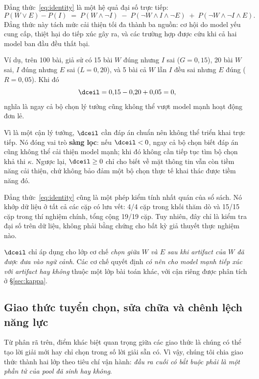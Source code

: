Đẳng thức~\eqref{eq:identity} là một hệ quả đại số trực tiếp:
\[
P(W \vee E) - P(I) \;=\; P(W \wedge \neg I) \;-\; P(\neg W \wedge I \wedge \neg E)
\;+\; P(\neg W \wedge \neg I \wedge E).
\]
Đẳng thức này tách mức cải thiện tối đa thành ba nguồn: cơ hội do model yếu cung cấp, thiệt hại
do tiếp xúc gây ra, và các trường hợp được cứu khi cả hai model ban đầu đều thất bại.

Ví dụ, trên 100 bài, giả sử có 15 bài $W$ đúng nhưng $I$ sai ($G=0{,}15$), 20 bài $W$ sai,
$I$ đúng nhưng $E$ sai ($L=0{,}20$), và 5 bài cả $W$ lẫn $I$ đều sai nhưng $E$ đúng
($R=0{,}05$). Khi đó
\[
\dceil = 0{,}15 - 0{,}20 + 0{,}05 = 0,
\]
nghĩa là ngay cả bộ chọn lý tưởng cũng không thể vượt model mạnh hoạt động đơn lẻ.

Vì là một cận lý tưởng, $\dceil$ cần đáp án chuẩn nên không thể triển khai trực tiếp. Nó đóng
vai trò \textbf{sàng lọc}: nếu $\dceil<0$, ngay cả bộ chọn biết đáp án cũng không thể cải thiện
model mạnh; khi đó không cần tiếp tục tìm bộ chọn khả thi $\kappa$. Ngược lại,
$\dceil\geq0$ chỉ cho biết về mặt thông tin vẫn còn tiềm năng cải thiện, chứ không bảo đảm một
bộ chọn thực tế khai thác được tiềm năng đó.

Đẳng thức~\eqref{eq:identity} cũng là một phép kiểm tính nhất quán của sổ sách. Nó khớp dữ
liệu ở tất cả các cặp có lưu vết: 4/4 cặp trong khối thăm dò và 15/15 cặp trong thí nghiệm
chính, tổng cộng 19/19 cặp. Tuy nhiên, đây chỉ là kiểm tra đại số trên dữ liệu, không phải bằng
chứng cho bất kỳ giả thuyết thực nghiệm nào.

$\dceil$ chỉ áp dụng cho lớp cơ chế \emph{chọn giữa $W$ và $E$ sau khi artifact của $W$ đã được
đưa vào ngữ cảnh}. Các cơ chế quyết định \emph{có nên cho model mạnh tiếp xúc với artifact hay
không} thuộc một lớp bài toán khác, với cận riêng được phân tích ở \S\ref{sec:kappa}.

\subsection{Giao thức tuyển chọn, sửa chữa và chênh lệch năng lực}\label{sec:protocols}

Từ phân rã trên, điểm khác biệt quan trọng giữa các giao thức là chúng có thể tạo lời giải mới
hay chỉ chọn trong số lời giải sẵn có. Vì vậy, chúng tôi chia giao thức thành hai lớp theo tiêu
chí vận hành: \emph{đầu ra cuối có bắt buộc phải là một phần tử của pool đã sinh hay không}.

